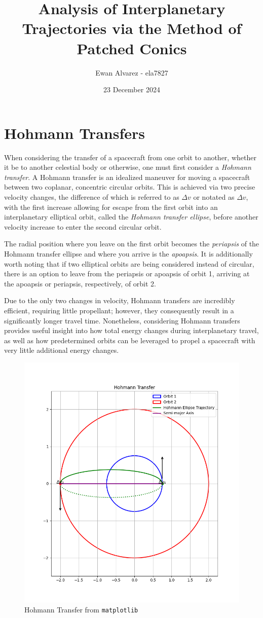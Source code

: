 \documentclass{article}
\title{Analysis of Interplanetary Trajectories via the Method of Patched Conics}
\author{Ewan Alvarez - ela7827}
\date{23 December 2024}
\numberwithin{figure}{section}
\begin{document}
\maketitle

\section{Hohmann Transfers}

When considering the transfer of a spacecraft from one orbit to another, whether it be to another celestial body or otherwise, one must first consider a \textit{Hohmann transfer}. A Hohmann transfer is an idealized maneuver for moving a spacecraft between two coplanar, concentric circular orbits. This is achieved via two precise velocity changes, the difference of which is referred to as \(\Delta v\) or notated as \(\Delta v\), with the first increase allowing for escape from the first orbit into an interplanetary elliptical orbit, called the \textit{Hohmann transfer ellipse}, before another velocity increase to enter the second circular orbit. 

The radial position where you leave on the first orbit becomes the \textit{periapsis} of the Hohmann transfer ellipse and where you arrive is the \textit{apoapsis}. It is additionally worth noting that if two elliptical orbits are being considered instead of circular, there is an option to leave from the periapsis or apoapsis of orbit 1, arriving at the apoapsis or periapsis, respectively, of orbit 2.

Due to the only two changes in velocity, Hohmann transfers are incredibly efficient, requiring little propellant; however, they consequently result in a significantly longer travel time. Nonetheless, considering Hohmann transfers provides useful insight into how total energy changes during interplanetary travel, as well as how predetermined orbits can be leveraged to propel a spacecraft with very little additional energy changes.

\begin{figure}
    \centering
    \includegraphics[width=0.5\linewidth]{hohman.png}
    \caption{Hohmann Transfer from \texttt{matplotlib}}
    \label{fig:enter-label}
\end{figure}
\end{document}

